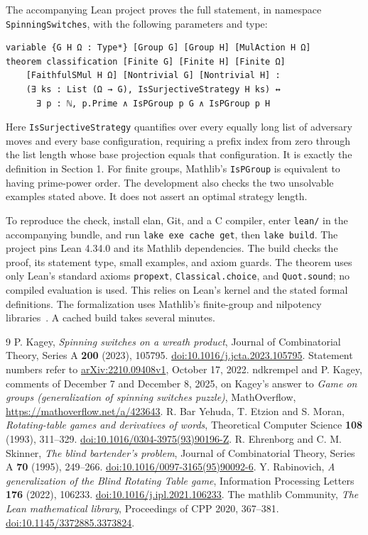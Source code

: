 \documentclass[11pt]{article}
\begin{document}
The accompanying Lean project proves the full statement, in namespace
\texttt{SpinningSwitches}, with the following parameters and type:
\begin{lstlisting}
variable {G H Ω : Type*} [Group G] [Group H] [MulAction H Ω]
theorem classification [Finite G] [Finite H] [Finite Ω]
    [FaithfulSMul H Ω] [Nontrivial G] [Nontrivial H] :
    (∃ ks : List (Ω → G), IsSurjectiveStrategy H ks) ↔
      ∃ p : ℕ, p.Prime ∧ IsPGroup p G ∧ IsPGroup p H
\end{lstlisting}
Here \texttt{IsSurjectiveStrategy} quantifies over every equally long list
of adversary moves and every base configuration, requiring a prefix
index from zero through the list length whose base projection equals
that configuration. It is exactly the definition in Section 1.
For finite groups, Mathlib's \texttt{IsPGroup} is equivalent to having
prime-power order. The development also checks the two unsolvable
examples stated above. It does not assert an optimal strategy length.

To reproduce the check, install elan, Git, and a C compiler, enter
\texttt{lean/} in the accompanying bundle, and run
\texttt{lake exe cache get}, then \texttt{lake build}.
The project pins Lean 4.34.0 and its Mathlib dependencies. The build checks
the proof, its statement type, small examples, and axiom guards.
The theorem uses only Lean's standard axioms \texttt{propext},
\texttt{Classical.choice}, and \texttt{Quot.sound}; no compiled evaluation
is used. This relies on Lean's kernel and the stated formal definitions.
The formalization uses Mathlib's finite-group and nilpotency
libraries~\cite{Mathlib}. A cached build takes several minutes.

\begin{thebibliography}{9}
P. Kagey, \emph{Spinning switches on a wreath product},
Journal of Combinatorial Theory, Series A \textbf{200} (2023), 105795.
\href{https://doi.org/10.1016/j.jcta.2023.105795}{doi:10.1016/j.jcta.2023.105795}.
Statement numbers refer to
\href{https://arxiv.org/abs/2210.09408v1}{arXiv:2210.09408v1}, October 17, 2022.
ndkrempel and P. Kagey, comments of December 7 and December 8, 2025,
on Kagey's answer to \emph{Game on groups (generalization of spinning switches puzzle)},
MathOverflow, \url{https://mathoverflow.net/a/423643}.
R. Bar Yehuda, T. Etzion and S. Moran,
\emph{Rotating-table games and derivatives of words},
Theoretical Computer Science \textbf{108} (1993), 311--329.
\href{https://doi.org/10.1016/0304-3975(93)90196-Z}{doi:10.1016/0304-3975(93)90196-Z}.
R. Ehrenborg and C. M. Skinner, \emph{The blind bartender's problem},
Journal of Combinatorial Theory, Series A \textbf{70} (1995), 249--266.
\href{https://doi.org/10.1016/0097-3165(95)90092-6}{doi:10.1016/0097-3165(95)90092-6}.
Y. Rabinovich, \emph{A generalization of the Blind Rotating Table game},
Information Processing Letters \textbf{176} (2022), 106233.
\href{https://doi.org/10.1016/j.ipl.2021.106233}{doi:10.1016/j.ipl.2021.106233}.
The mathlib Community, \emph{The Lean mathematical library},
Proceedings of CPP 2020, 367--381.
\href{https://doi.org/10.1145/3372885.3373824}{doi:10.1145/3372885.3373824}.
\end{thebibliography}
\end{document}
